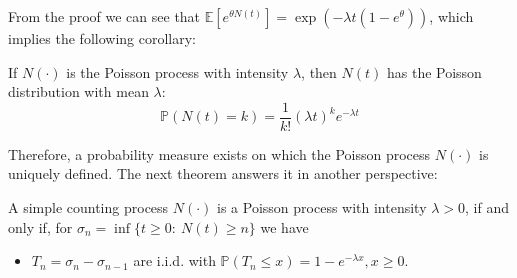 From the proof we can see that $\mathbb{E}[e^{\theta N(t)}]=\exp(-\lambda t(1-e^{\theta}))$, which implies the following corollary:
\begin{corollary}
If $N(\cdot)$ is the Poisson process with intensity $\lambda$, then $N(t)$ has the Poisson distribution with mean $\lambda$:
\[
\mathbb{P}(N(t)=k) = \frac{1}{k!}(\lambda t)^ke^{-\lambda t}
\]
\end{corollary}
Therefore, a probability measure exists on which the Poisson process $N(\cdot)$ is uniquely defined.
The next theorem answers it in another perspective:
\begin{theorem}
A simple counting process $N(\cdot)$ is a Poisson process with intensity $\lambda>0$,
if and only if, for $\sigma_n=\inf\{t\ge0:~N(t)\ge n\}$ we have
\begin{itemize}
\item
$T_n=\sigma_n - \sigma_{n-1}$ are i.i.d. with $\mathbb{P}(T_n\le x) = 1-e^{-\lambda x}, x\ge0$.
\end{itemize}
\end{theorem}
